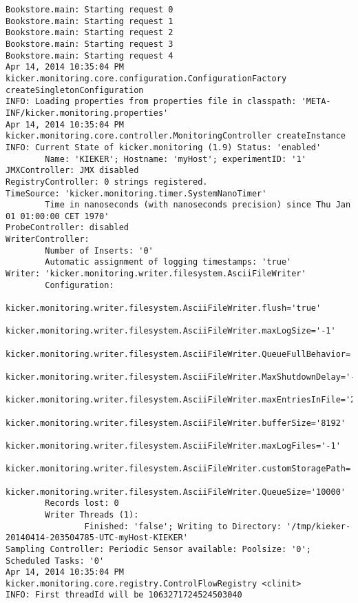 \setTextListing
\begin{lstlisting}[caption=Execution of the Bookstore with AspectJ trace instrumentation (Section~\ref{sec:traceAnalysis:instr:AspectJ})]
Bookstore.main: Starting request 0
Bookstore.main: Starting request 1
Bookstore.main: Starting request 2
Bookstore.main: Starting request 3
Bookstore.main: Starting request 4
Apr 14, 2014 10:35:04 PM kicker.monitoring.core.configuration.ConfigurationFactory createSingletonConfiguration
INFO: Loading properties from properties file in classpath: 'META-INF/kicker.monitoring.properties'
Apr 14, 2014 10:35:04 PM kicker.monitoring.core.controller.MonitoringController createInstance
INFO: Current State of kicker.monitoring (1.9) Status: 'enabled'
        Name: 'KIEKER'; Hostname: 'myHost'; experimentID: '1'
JMXController: JMX disabled
RegistryController: 0 strings registered.
TimeSource: 'kicker.monitoring.timer.SystemNanoTimer'
        Time in nanoseconds (with nanoseconds precision) since Thu Jan 01 01:00:00 CET 1970'
ProbeController: disabled
WriterController:
        Number of Inserts: '0'
        Automatic assignment of logging timestamps: 'true'
Writer: 'kicker.monitoring.writer.filesystem.AsciiFileWriter'
        Configuration:
                kicker.monitoring.writer.filesystem.AsciiFileWriter.flush='true'
                kicker.monitoring.writer.filesystem.AsciiFileWriter.maxLogSize='-1'
                kicker.monitoring.writer.filesystem.AsciiFileWriter.QueueFullBehavior='0'
                kicker.monitoring.writer.filesystem.AsciiFileWriter.MaxShutdownDelay='-1'
                kicker.monitoring.writer.filesystem.AsciiFileWriter.maxEntriesInFile='25000'
                kicker.monitoring.writer.filesystem.AsciiFileWriter.bufferSize='8192'
                kicker.monitoring.writer.filesystem.AsciiFileWriter.maxLogFiles='-1'
                kicker.monitoring.writer.filesystem.AsciiFileWriter.customStoragePath=''
                kicker.monitoring.writer.filesystem.AsciiFileWriter.QueueSize='10000'
        Records lost: 0
        Writer Threads (1): 
                Finished: 'false'; Writing to Directory: '/tmp/kieker-20140414-203504785-UTC-myHost-KIEKER'
Sampling Controller: Periodic Sensor available: Poolsize: '0'; Scheduled Tasks: '0'
Apr 14, 2014 10:35:04 PM kicker.monitoring.core.registry.ControlFlowRegistry <clinit>
INFO: First threadId will be 1063271724524503040
\end{lstlisting}


